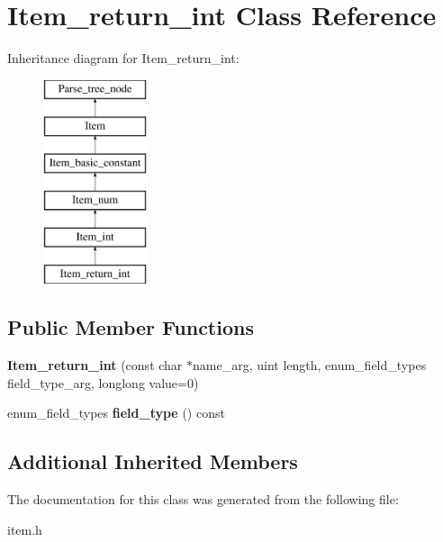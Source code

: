 \hypertarget{classItem__return__int}{}\section{Item\+\_\+return\+\_\+int Class Reference}
\label{classItem__return__int}
Inheritance diagram for Item\+\_\+return\+\_\+int\+:\begin{figure}[H]
\begin{center}
\leavevmode
\includegraphics[height=6.000000cm]{classItem__return__int}
\end{center}
\end{figure}
\subsection*{Public Member Functions}
\begin{DoxyCompactItemize}
\item 
\mbox{\label{classItem__return__int_a0c5d4c645549ea479bb6db5c1a452fcf}} 
{\bfseries Item\+\_\+return\+\_\+int} (const char $\ast$name\+\_\+arg, uint length, enum\+\_\+field\+\_\+types field\+\_\+type\+\_\+arg, longlong value=0)
\item 
\mbox{\label{classItem__return__int_a5586e6f521ae19989832237774b15114}} 
enum\+\_\+field\+\_\+types {\bfseries field\+\_\+type} () const
\end{DoxyCompactItemize}
\subsection*{Additional Inherited Members}


The documentation for this class was generated from the following file\+:\begin{DoxyCompactItemize}
\item 
item.\+h\end{DoxyCompactItemize}

